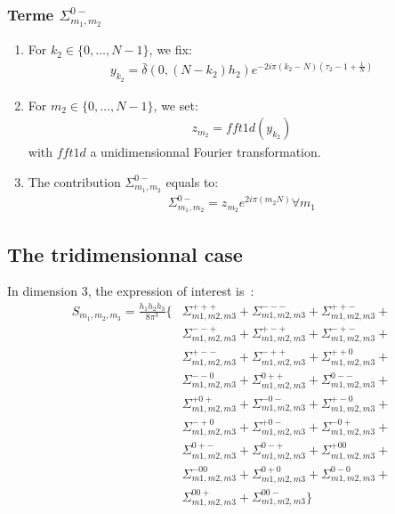 \subsubsection{Terme $\Sigma_{m_1,m_2}^{0-}$}
\begin{enumerate}
\item For $k_2\in\{0,\hdots,N-1\}$, we fix:
\begin{align*}
y_{k_2}= \bar{\delta}(0,(N-k_2)h_2)e^{-2i\pi (k_2-N)\left(\tau_2-1+\frac{1}{N}\right)}
\end{align*}
\item For $m_2\in\{0,\hdots,N-1\}$, we set:
\begin{align*}
  z_{m_2}=fft1d(y_{k_2})
\end{align*}
with $fft1d$ a unidimensionnal Fourier transformation.
\item The contribution $\Sigma_{m_1,m_2}^{0-}$ equals to:
\begin{align*}
  \Sigma_{m_1,m_2}^{0-}=z_{m_2}e^{2i\pi\left(m_2 N\right)} \forall m_1
\end{align*}
\end{enumerate}

\subsection{The tridimensionnal case}
In dimension 3, the expression of interest is~:
\begin{align*}
S_{m_1,m_2,m_3}=\frac{h_1h_2h_3}{8\pi^3}\Big\{& \Sigma_{m1,m2,m3}^{+++} + \Sigma_{m1,m2,m3}^{---} + \Sigma_{m1,m2,m3}^{++-} +\nonumber\\
     &\Sigma_{m1,m2,m3}^{--+} + \Sigma_{m1,m2,m3}^{+-+} + \Sigma_{m1,m2,m3}^{-+-} +\nonumber\\
     &\Sigma_{m1,m2,m3}^{+--} + \Sigma_{m1,m2,m3}^{-++} + \Sigma_{m1,m2,m3}^{++0} +\nonumber\\
     &\Sigma_{m1,m2,m3}^{--0} + \Sigma_{m1,m2,m3}^{0++} + \Sigma_{m1,m2,m3}^{0--} +\nonumber\\
     &\Sigma_{m1,m2,m3}^{+0+} + \Sigma_{m1,m2,m3}^{-0-} + \Sigma_{m1,m2,m3}^{+-0} +\nonumber\\
     &\Sigma_{m1,m2,m3}^{-+0} + \Sigma_{m1,m2,m3}^{+0-} + \Sigma_{m1,m2,m3}^{-0+} +\nonumber\\
     &\Sigma_{m1,m2,m3}^{0+-} + \Sigma_{m1,m2,m3}^{0-+} + \Sigma_{m1,m2,m3}^{+00} +\nonumber\\
     &\Sigma_{m1,m2,m3}^{-00} + \Sigma_{m1,m2,m3}^{0+0} + \Sigma_{m1,m2,m3}^{0-0} +\nonumber\\
     &\Sigma_{m1,m2,m3}^{00+} + \Sigma_{m1,m2,m3}^{00-}
\Big\}
\end{align*}

